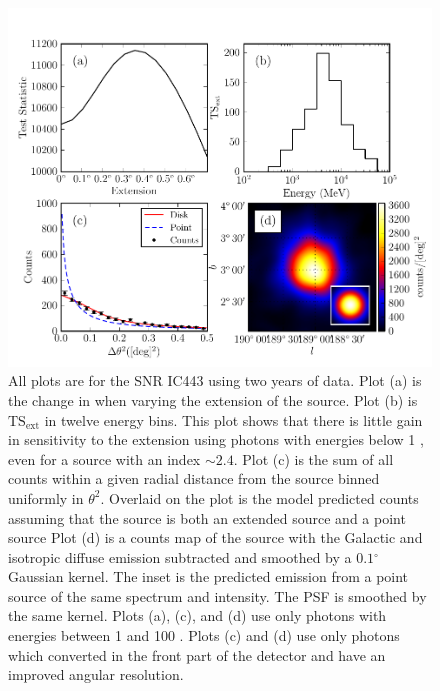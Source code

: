 \documentclass[12pt,preprint]{aastex}
\newcommand{\gev}{\text{GeV}\xspace}
\newcommand{\tsext}{{\ensuremath{\text{TS}_{\text{ext}}}}\xspace}
\newcommand{\ts}{\text{TS}\xspace}
\renewcommand{\deg}{\ensuremath{^\circ}\xspace}
\renewcommand{\approx}{\sim\!\xspace}
\begin{document}
\clearpage
\begin{figure}
  \begin{center}
    \includegraphics{ic443_plots/four_plots_ic443.pdf}
    \caption{
    All plots are for the SNR IC443 using two years of data.
    Plot (a) is the change in \ts when varying the
    extension of the source.  
    Plot (b) is \tsext in twelve energy bins. This plot shows that there is
    little gain in sensitivity to the extension using photons
    with energies below 1 \gev, even for a source with an index $\approx2.4$.
    Plot (c) is the sum of all counts within a given radial distance
    from the source binned uniformly in $\theta^2$. 
    Overlaid on the plot is the model predicted counts assuming that
    the source is both an extended source and a point source
    Plot (d) is a counts map of the source with the Galactic and
    isotropic diffuse emission subtracted and smoothed by a $0.1\deg$
    Gaussian kernel.  The inset is the predicted emission from a point
    source of the same spectrum and intensity.  The PSF is smoothed
    by the same kernel.  Plots (a), (c), and (d) use only photons with
    energies between 1 \gev and 100 \gev. Plots (c) and (d)
    use only photons which converted in the front
    part of the detector and have an improved angular resolution.
    }
    \label{four_plots_ic443}
  \end{center}
\end{figure}
\end{document}
